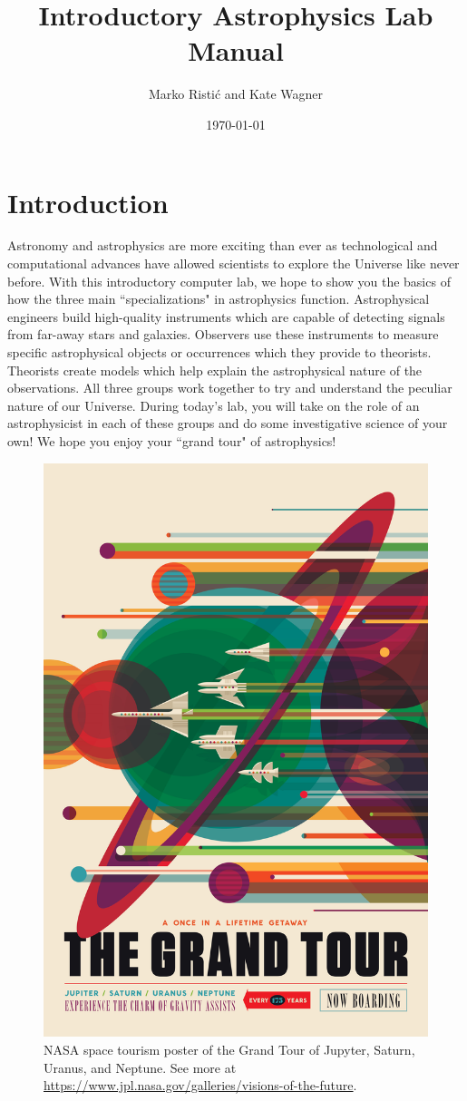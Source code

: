 \documentclass[14pt]{article}
\title{Introductory Astrophysics Lab Manual}
\author{Marko Risti\'c and Kate Wagner}
\date{\today}
\begin{document}


\clearpage

\maketitle

\section{Introduction}

Astronomy and astrophysics are more exciting than ever as technological and computational advances have allowed scientists to explore the Universe like never before. With this introductory computer lab, we hope to show you the basics of how the three main ``specializations" in astrophysics function. Astrophysical engineers build high-quality instruments which are capable of detecting signals from far-away stars and galaxies. Observers use these instruments to measure specific astrophysical objects or occurrences which they provide to theorists. Theorists create models which help explain the astrophysical nature of the observations. All three groups work together to try and understand the peculiar nature of our Universe. During today's lab, you will take on the role of an astrophysicist in each of these groups and do some investigative science of your own! We hope you enjoy your ``grand tour" of astrophysics!

\begin{figure}[hb!]
    \centering
    \includegraphics[width=.475\linewidth]{grand_tour.jpg}
    \caption{NASA space tourism poster of the Grand Tour of Jupyter, Saturn, Uranus, and Neptune. See more at \url{https://www.jpl.nasa.gov/galleries/visions-of-the-future}.}
    \label{fig:my_label}
\end{figure}
\end{document}
